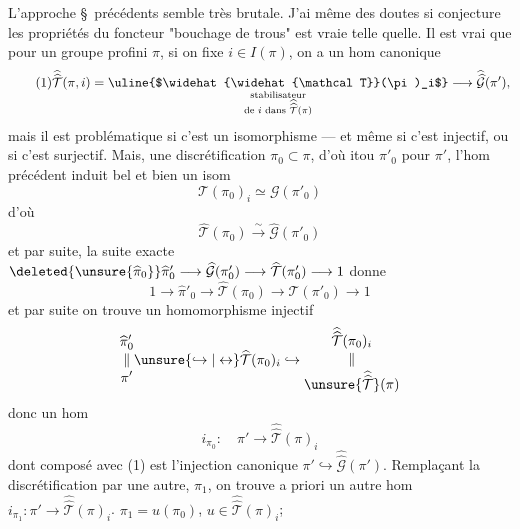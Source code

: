 L'approche  \S\ précédents semble  très brutale. J'ai même des doutes si   conjecture  les propriétés du foncteur "bouchage de trous" est vraie telle quelle. Il est vrai que pour un groupe profini    $\pi$, si on fixe $i\in I(\pi)$, on a un hom canonique
\[
\tag{1}
\widehat{\widehat{\mathcal T}}(\pi,i)
=\underset{\substack{\text{stabilisateur}\\\text{de }i\text{ dans }\widehat{\widehat{\mathcal T}}(\pi)}}{\text{\uline{$\widehat{\widehat{\mathcal T}}(\pi)_i$}}}
\longrightarrow \widehat{\widehat{\mathcal G}}(\pi'),
\]
mais il est problématique si c'est un isomorphisme --- et même si c'est injectif, ou si c'est surjectif. Mais,  une discrétification $\pi_0\subset\pi$, d'où itou $\pi'_0$ pour $\pi'$, l'hom précédent induit bel et bien un isom
\[
\tag{1}
\mathcal T(\pi_0)_i\simeq\mathcal G(\pi'_0)
\]
d'où
\[
\tag{3}
\widehat{\mathcal T}(\pi_0)\xrightarrow{\sim}\widehat{\mathcal G}(\pi'_0)
\]
et par suite, la suite exacte $\deleted{\unsure{\widehat{\pi}_0}}\widehat{\pi}'_0\longrightarrow\widehat{\mathcal G}(\pi'_0)\longrightarrow\widehat{\mathcal T}(\pi'_0)\longrightarrow 1$ donne
\[
\tag{4}
1\longrightarrow\widehat{\pi}'_0\longrightarrow\widehat{\mathcal T}(\pi_0)\longrightarrow\widehat{\mathcal T}(\pi'_0)\longrightarrow 1
\]
et par suite on trouve un homomorphisme injectif
\[
\begin{gathered}\widehat{\pi}'_0\\[-0.5ex]\Vert\\[-0.5ex]\pi'\end{gathered}
\unsure{\hookrightarrow|\leftrightarrow}
\widehat{\mathcal T}(\pi_0)_i
\hookrightarrow
\begin{gathered}\widehat{\widehat{\mathcal T}}(\pi_0)_i\\[-0.5ex]\Vert\\[-0.5ex]\unsure{\widehat{\widehat{\mathcal T}}}(\pi)\end{gathered}
\]
donc un hom
\[
\tag{5}
i_{\pi_0}:\quad\pi'\longrightarrow\widehat{\widehat{\mathcal T}}(\pi)_i
\]
dont  composé avec (1) est l'injection canonique $\pi'\hookrightarrow\widehat{\widehat{\mathcal G}}(\pi')$. Remplaçant la discrétification  par une autre, $\pi_1$, on trouve a priori un autre hom $i_{\pi_1}:\pi'\longrightarrow\widehat{\widehat{\mathcal T}}(\pi)_i$.  $\pi_1=u(\pi_0)$, $u\in\widehat{\widehat{\mathcal T}}(\pi)_i$;

